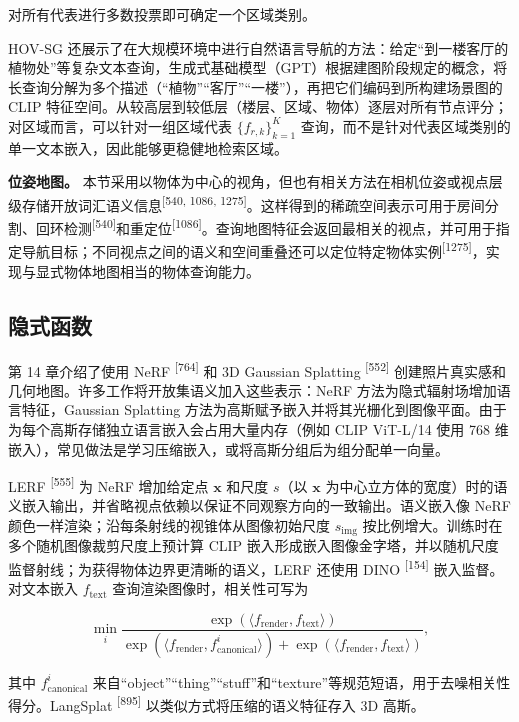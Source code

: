 对所有代表进行多数投票即可确定一个区域类别。

HOV-SG 还展示了在大规模环境中进行自然语言导航的方法：给定“到一楼客厅的植物处”等复杂文本查询，生成式基础模型（GPT）根据建图阶段规定的概念，将长查询分解为多个描述（“植物”“客厅”“一楼”），再把它们编码到所构建场景图的 CLIP 特征空间。从较高层到较低层（楼层、区域、物体）逐层对所有节点评分；对区域而言，可以针对一组区域代表 $\{f_{r,k}\}_{k=1}^{K}$ 查询，而不是针对代表区域类别的单一文本嵌入，因此能够更稳健地检索区域。

\textbf{位姿地图。} 本节采用以物体为中心的视角，但也有相关方法在相机位姿或视点层级存储开放词汇语义信息\textsuperscript{[540, 1086, 1275]}。这样得到的稀疏空间表示可用于房间分割、回环检测\textsuperscript{[540]}和重定位\textsuperscript{[1086]}。查询地图特征会返回最相关的视点，并可用于指定导航目标；不同视点之间的语义和空间重叠还可以定位特定物体实例\textsuperscript{[1275]}，实现与显式物体地图相当的物体查询能力。

\subsection{隐式函数}

第 14 章介绍了使用 NeRF \textsuperscript{[764]} 和 3D Gaussian Splatting \textsuperscript{[552]} 创建照片真实感和几何地图。许多工作将开放集语义加入这些表示：NeRF 方法为隐式辐射场增加语言特征，Gaussian Splatting 方法为高斯赋予嵌入并将其光栅化到图像平面。由于为每个高斯存储独立语言嵌入会占用大量内存（例如 CLIP ViT-L/14 使用 768 维嵌入），常见做法是学习压缩嵌入，或将高斯分组后为组分配单一向量。

LERF \textsuperscript{[555]} 为 NeRF 增加给定点 $\boldsymbol{x}$ 和尺度 $s$（以 $\boldsymbol{x}$ 为中心立方体的宽度）时的语义嵌入输出，并省略视点依赖以保证不同观察方向的一致输出。语义嵌入像 NeRF 颜色一样渲染；沿每条射线的视锥体从图像初始尺度 $s_{\mathrm{img}}$ 按比例增大。训练时在多个随机图像裁剪尺度上预计算 CLIP 嵌入形成嵌入图像金字塔，并以随机尺度监督射线；为获得物体边界更清晰的语义，LERF 还使用 DINO \textsuperscript{[154]} 嵌入监督。对文本嵌入 $f_{\mathrm{text}}$ 查询渲染图像时，相关性可写为

\begin{equation}
\min_i\frac{\exp(\langle f_{\mathrm{render}},f_{\mathrm{text}}\rangle)}{
\exp(\langle f_{\mathrm{render}},f_{\mathrm{canonical}}^i\rangle)+
\exp(\langle f_{\mathrm{render}},f_{\mathrm{text}}\rangle)},\tag{17.7}
\end{equation}

其中 $f_{\mathrm{canonical}}^i$ 来自“object”“thing”“stuff”和“texture”等规范短语，用于去噪相关性得分。LangSplat \textsuperscript{[895]} 以类似方式将压缩的语义特征存入 3D 高斯。

